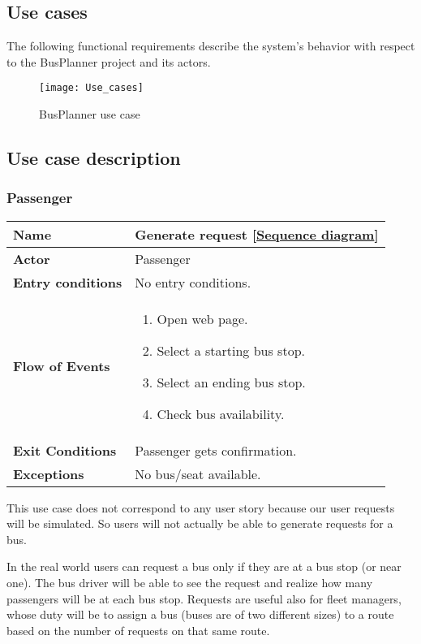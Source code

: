 \subsection{Use cases}
The following functional requirements describe the system’s behavior with respect to the BusPlanner project and its actors.
\begin{figure}[H]
	\centering
	\texttt{[image: Use\_cases]}
	\caption{BusPlanner use case}
\end{figure}
\subsection{Use case description}
\subsubsection{Passenger}
\begin{table}[H]
	\centering
	\begin{tabular}{| m{3.5cm} | m{9.5cm} |}
		\hline
		\textbf{Name} & Generate request [\hyperlink{Generate_request}{Sequence diagram}]\\
		\hline
		\textbf{Actor} & Passenger\\
		\hline
		\textbf{Entry conditions} & No entry conditions.\\
		\hline
		\textbf{Flow of Events} & 
		\begin{enumerate}
			\item Open web page.
			\item Select a starting bus stop.
			\item Select an ending bus stop.
			\item Check bus availability.
		\end{enumerate}\\
		\hline
		\textbf{Exit Conditions} & Passenger gets confirmation.\\
		\hline
		\textbf{Exceptions} & No bus/seat available.\\
		\hline
	\end{tabular}
\end{table}
This use case does not correspond to any user story because our user requests will be simulated. So users will not actually be able to generate requests for a bus.

In the real world users can request a bus only if they are at a bus stop (or near one). The bus driver will be able to see the request and realize how many passengers will be at each bus stop. Requests are useful also for fleet managers, whose duty will be to assign a bus (buses are of two different sizes) to a route based on the number of requests on that same route. 

